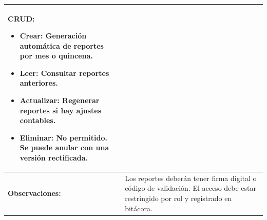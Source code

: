\begin{table}[h]
\begin{tabular}{|p{5cm}|p{9cm}|}
		\textbf{CRUD:}
		\begin{itemize}
			\item \textbf{Crear:} Generación automática de reportes por mes o quincena.
			\item \textbf{Leer:} Consultar reportes anteriores.
			\item \textbf{Actualizar:} Regenerar reportes si hay ajustes contables.
			\item \textbf{Eliminar:} No permitido. Se puede anular con una versión rectificada.
		\end{itemize}
		\\ \hline
		\textbf{Observaciones:}                   & Los reportes deberán tener firma digital o código de validación. El acceso debe estar restringido por rol y registrado en bitácora.
		\\ \hline
	\end{tabular}
\end{table}


